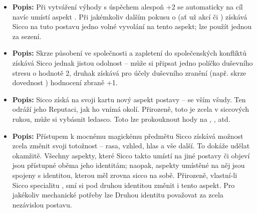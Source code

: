\documentclass[../main.tex]{subfiles}
\begin{document}
\begin{specialita}
\begin{itemize}
	\item \textbf{Popis:} Při vytváření výhody  s úspěchem alespoň +2 se automaticky na cíl navíc umístí aspekt . Při jakémkoliv dalším pokusu o  (ať už akcí  či ) získává Sicco na tuto postavu jedno volné vyvolání na tento aspekt; lze použít jednou za sezení.
\end{itemize}
\end{specialita}

\begin{specialita}
\begin{itemize}
	\item \textbf{Popis:} Skrze působení ve společnosti a zapletení do společenských konfliktů získává Sicco jednak jistou odolnost – může si připsat jedno políčko duševního stresu o hodnotě 2, druhak získává pro účely duševního zranění (např. skrze dovednost ) hodnocení zbraně +1.
\end{itemize}
\end{specialita}

\begin{specialita}[Reputace, IV]
\begin{itemize}
	\item \textbf{Popis:} Sicco získá na svoji kartu nový aspekt postavy – se vším všudy. Ten odráží jeho Reputaci, jak ho vnímá okolí. Přirozeně, toto je zcela v siccových rukou, může si vybásnit ledasco. Toto lze prokouknout hody na , ,  atd.
\end{itemize}
\end{specialita}

\begin{specialita}
\begin{itemize}
	\item \textbf{Popis:} Přístupem k mocnému magickému předmětu Sicco získává možnost zcela změnit svoji totožnost – rasa, vzhled, hlas a vše další. To dokáže udělat okamžitě. Všechny aspekty, které Sicco takto umístí na jiné postavy či objeví jsou přístupné oběma jeho identitám; naopak, aspekty umístěné na něj jsou spojeny s identitou, kterou měl zrovna sicco na sobě. Přirozeně, vlastní-li Sicco specialitu , smí si pod druhou identitou změnit i tento aspekt. Pro jakékoliv mechanické potřeby lze Druhou identitu považovat za zcela nezávislou postavu.
\end{itemize}
\end{specialita}
\end{document}

